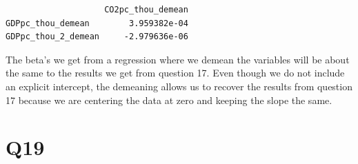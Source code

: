\documentclass[
  letterpaper,
  DIV=11,
  numbers=noendperiod]{scrartcl}
\newenvironment{Shaded}{\begin{snugshade}}{\end{snugshade}}
\newcommand{\NormalTok}[1]{\textcolor[rgb]{0.00,0.23,0.31}{#1}}
\newcommand{\SpecialCharTok}[1]{\textcolor[rgb]{0.37,0.37,0.37}{#1}}
\begin{document}
\begin{Shaded}
\end{Shaded}

\begin{verbatim}
                    CO2pc_thou_demean
GDPpc_thou_demean        3.959382e-04
GDPpc_thou_2_demean     -2.979636e-06
\end{verbatim}

The beta's we get from a regression where we demean the variables will
be about the same to the results we get from question 17. Even though we
do not include an explicit intercept, the demeaning allows us to recover
the results from question 17 because we are centering the data at zero
and keeping the slope the same.

\section{Q19}\label{q19}
\end{document}
